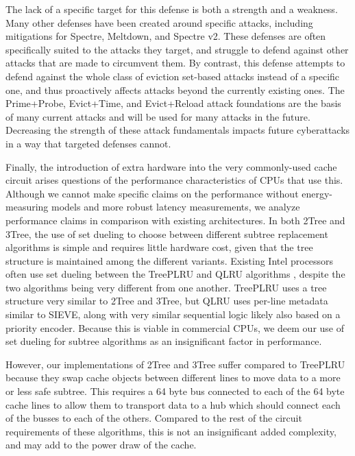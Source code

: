\documentclass[letterpaper]{article}
\begin{document}
The lack of a specific target for this defense is both a strength and a weakness.
Many other defenses have been created around specific attacks,
including mitigations for Spectre, Meltdown, and Spectre v2.
These defenses are often specifically suited to the attacks they target,
and struggle to defend against other attacks that are made to circumvent them.
By contrast, this defense attempts to defend against the whole class of
eviction set-based attacks instead of a specific one,
and thus proactively affects attacks beyond the currently existing ones.
The Prime+Probe, Evict+Time, and Evict+Reload attack foundations
are the basis of many current attacks and will be used for many attacks in the future.
Decreasing the strength of these attack fundamentals impacts
future cyberattacks in a way that targeted defenses cannot.

Finally, the introduction of extra hardware into the very commonly-used cache circuit
arises questions of the performance characteristics of CPUs that use this.
Although we cannot make specific claims on the performance without energy-measuring models
and more robust latency measurements,
we analyze performance claims in comparison with existing architectures.
In both 2Tree and 3Tree, the use of set dueling to choose between different subtree replacement algorithms
is simple and requires little hardware cost, given that the tree structure is maintained
among the different variants.
Existing Intel processors often use set dueling between the TreePLRU and QLRU algorithms
\cite{EvictionSetsAtScale}, despite the two algorithms being very different from one another.
TreePLRU uses a tree structure very similar to 2Tree and 3Tree,
but QLRU uses per-line metadata similar to SIEVE,
along with very similar sequential logic likely also based on a priority encoder.
Because this is viable in commercial CPUs, we deem our use of set dueling for subtree algorithms
as an insignificant factor in performance.

However, our implementations of 2Tree and 3Tree suffer compared to TreePLRU
because they swap cache objects between different lines to move data to a more or less safe subtree.
This requires a 64 byte bus connected to each of the 64 byte cache lines
to allow them to transport data to a hub which should connect each of the busses to each of the others.
Compared to the rest of the circuit requirements of these algorithms,
this is not an insignificant added complexity, and may add to the power draw of the cache.
\end{document}
